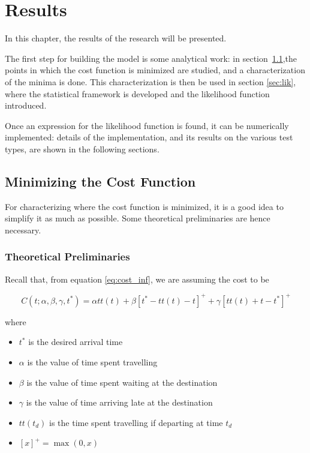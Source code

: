 \chapter{Results}
\label{chap:res}

In this chapter, the results of the research will be presented.

The first step for building the model is some analytical work:
in section~\ref{sec:minimum},the points in which the cost function is minimized are studied,
and a characterization of the minima is done.
This characterization is then be used in section \ref{sec:lik},
where the statistical framework is developed and the likelihood function introduced.

Once an expression for the likelihood function is found,
it can be numerically implemented:
details of the implementation, and its results on the various test types,
are shown in the following sections.

\section{Minimizing the Cost Function}
\label{sec:minimum}

For characterizing where the cost function is minimized,
it is a good idea to simplify it as much as possible.
Some theoretical preliminaries are hence necessary.

\subsection{Theoretical Preliminaries}
\label{sec:pre_minimizing}

Recall that, from equation \eqref{eq:cost_inf}, we are assuming the cost to be

\begin{equation*}
  C(t; \alpha, \beta, \gamma, t^*) = \alpha tt(t) + \beta [t^* - tt(t) - t]^+ + \gamma[tt(t) + t - t^*]^+
\end{equation*}

where

\begin{itemize}
\item \(t^*\) is the desired arrival time
\item \(\alpha\) is the value of time spent travelling
\item \(\beta\) is the value of time spent waiting at the destination
\item \(\gamma\) is the value of time arriving late at the destination
\item \(tt(t_d)\) is the time spent travelling if departing at time \(t_d\)
\item \([x]^+ = \max(0, x)\)
\end{itemize}


